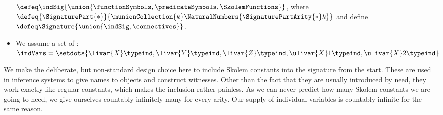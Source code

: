 \documentclass[notes,mh]{mikoslides}
\begin{document}
\begin{module}[id=pl1-signature]
\begin{frame}
\begin{itemize}
\begin{definition}[id=fo-signature.def,
      for={connectives,functionSymbolArity,functionSymbol,predicateSymbolsArity,predicateSymbols,SkolemFunctionsArity,SkolemFunctions
        constantSymbols}]
\begin{itemize}
        $\defeq\indSig{\union{\functionSymbols,\predicateSymbols,\SkolemFunctions}}$,
        where
        $\defeq{\SignaturePart{*}}{\munionCollection{k}\NaturalNumbers{\SignaturePartArity{*}k}}$
        and define $\defeq\Signature{\union{\indSig,\connectives}}$.
      \end{itemize}
    \end{definition}
  \item 
    \begin{definition}[id=fologic.def,for=indVars,display=flow]
      We assume a set of :
      $\indVars=\setdots{\livar{X}\typeind,\livar{Y}\typeind,\livar{Z}\typeind,\ulivar{X}1\typeind,\ulivar{X}2\typeind}$
   \end{definition}
  \end{itemize}
\end{frame}

\begin{nomtext}
  We make the deliberate, but non-standard design choice here to include Skolem constants
  into the signature from the start. These are used in inference systems to give names to
  objects and construct witnesses. Other than the fact that they are usually introduced by
  need, they work exactly like regular constants, which makes the inclusion rather
  painless. As we can never predict how many Skolem constants we are going to need, we
  give ourselves countably infinitely many for every arity. Our supply of individual
  variables is countably infinite for the same reason.
\end{nomtext}
\end{module}
\end{document}
